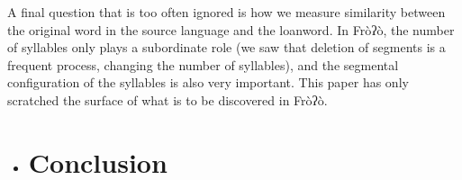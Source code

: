 A final question that is too often ignored is how we measure similarity between the original word in the source language and the loanword. In Fròʔò, the number of syllables only plays a subordinate role (we saw that deletion of segments is a frequent process, changing the number of syllables), and the segmental configuration of the syllables is also very important. This paper has only scratched the surface of what is to be discovered in Fròʔò.

\begin{itemize}
\item \section{ Conclusion}\end{itemize}

